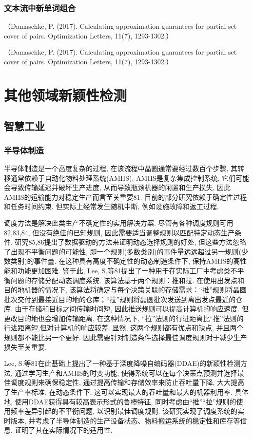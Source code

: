 \documentclass{Style/aas}
\begin{document}
\begin{multicols}{2}
  \subsubsection{文本流中新单词组合}
  （Damaschke, P. (2017). Calculating approximation guarantees for partial set cover of pairs. Optimization Letters, 11(7), 1293-1302.）

  （Damaschke, P. (2017). Calculating approximation guarantees for partial set cover of pairs. Optimization Letters, 11(7), 1293-1302.）





  \section{其他领域新颖性检测}
  \subsection{智慧工业}
  \subsubsection{半导体制造}
  半导体制造是一个高度复杂的过程, 在该流程中晶圆通常要经过数百个步骤, 其转移通常依赖于自动化物料处理系统(AMHS). AMHS是复杂集成控制系统, 它们可能会导致传输延迟并破坏生产进度, 从而导致瓶颈机器的闲置和生产损失, 因此AMHS的运输能力对稳定生产而言至关重要81. 目前的部分研究依赖于确定性过程和任务时间约束, 但实际上经常发生随机中断, 例如设施故障和返工过程.

  调度方法是解决此类生产不确定性的实用解决方案. 尽管有各种调度规则可用82,83,84, 但没有绝佳的已知规则, 因此需要适当调整规则以匹配特定动态生产条件. 研究85,86提出了数据驱动的方法来证明动态选择规则的好处, 但这些方法忽略了出现不平衡问题的可能性, 即一个规则(多数类别)的事件量远远超过另一规则(少数类别)的事件量. 在这种具有高度不确定性的动态制造条件下, 保持AMHS的高性能和功能更加困难. 鉴于此, Lee, S.等81提出了一种用于在实际工厂中考虑类不平衡问题的存储分配动态调度系统. 该算法基于两个规则：推和拉. 在使用出发点和目的地机器的情况下, 该算法将确定与每个决策关联的存储需求：“推”规则将晶圆批次交付到最接近目的地的仓库；“拉”规则将晶圆批次发送到离出发点最近的仓库. 由于存储和目标之间传输时间短, 因此推送规则可以提高计算机的响应速度. 但更改目的地也会增加传输距离, 在这种情况下, “拉”法则的行进距离比“推”法则的行进距离短,但对计算机的响应较差. 显然, 这两个规则都有优点和缺点, 并且两个规则都不能比另一个更好. 因此需要针对制造条件选择最佳调度规则对于减少生产损失至关重要.

  Lee, S.等81在此基础上提出了一种基于深度降噪自编码器(DDAE)的新颖性检测方法, 通过学习生产和AMHS的时变功能, 使得系统可以在每个决策点预测并选择最佳调度规则来确保稳定性, 通过提高传输和存储效率来防止吞吐量下降, 大大提高了生产率标准. 在动态条件下, 这可以实现最大的吞吐量和最大的机器利用率. 具体地, 使用DDAE获得具有较高表示形式的鲁棒特征, 同时考虑由“推”“拉”规则的使用频率差异引起的不平衡问题, 以识别最佳调度规则. 该研究实现了调度系统的实时版本, 并考虑了半导体制造的生产设备状态、物料搬运系统的稳定性和库存等信息, 证明了其在实际情况下的适用性.


\end{multicols}
\end{document}
